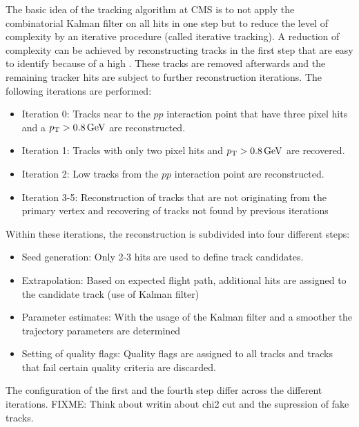 The basic idea of the tracking algorithm at CMS is to not apply the combinatorial Kalman filter on all hits in one step but to reduce the level of complexity by an iterative procedure (called iterative tracking).
A reduction of complexity can be achieved by reconstructing tracks in the first step that are easy to identify because of \eg a high \pt. 
These tracks are removed afterwards and the remaining tracker hits are subject to further reconstruction iterations.
The following iterations are performed:
\begin{itemize}
\item Iteration 0: Tracks near to the $pp$ interaction point that have three pixel hits and a $p_{\text{T}}>0.8\,\text{Ge}\kern-0.06667em\text{V}$ are reconstructed.
\item Iteration 1: Tracks with only two pixel hits and $p_{\text{T}}>0.8\,\text{Ge}\kern-0.06667em\text{V}$ are recovered.
\item Iteration 2: Low \pt tracks from the $pp$ interaction point are reconstructed.
\item Iteration 3-5: Reconstruction of tracks that are not originating from the primary vertex and recovering of tracks not found by previous iterations
\end{itemize}
Within these iterations, the reconstruction is subdivided into four different steps:
\begin{itemize}
\item Seed generation: Only 2-3 hits are used to define track candidates.
\item Extrapolation: Based on expected flight path, additional hits are assigned to the candidate track (use of Kalman filter)
\item Parameter estimates: With the usage of the Kalman filter and a smoother the trajectory parameters are determined
\item Setting of quality flags: Quality flags are assigned to all tracks and tracks that fail certain quality criteria are discarded.
\end{itemize}
The configuration of the first and the fourth step differ across the different iterations.  
FIXME: Think about writin about chi2 cut and the supression of fake tracks.

